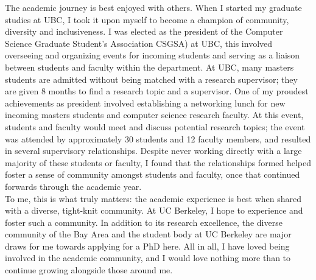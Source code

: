 \documentclass[10pt]{article} %
\begin{document}
The academic journey is best enjoyed with others. When I started my graduate studies at UBC, I took it upon myself to become a champion of community, diversity and inclusiveness. I was elected as the president of the Computer Science Graduate Student's Association CSGSA) at UBC, this involved overseeing and organizing events for incoming students and serving as a liaison between students and faculty within the department. At UBC, many masters students are admitted without being matched with a research supervisor; they are given 8 months to find a research topic and a supervisor. One of my proudest achievements as president involved establishing a networking lunch for new incoming masters students and computer science research faculty. At this event, students and faculty would meet and discuss potential research topics; the event was attended by approximately 30 students and 12 faculty members, and resulted in several supervisory relationships. Despite never working directly with a large majority of these students or faculty, I found that the relationships formed helped foster a sense of community amongst students and faculty, once that continued forwards through the academic year. \\

To me, this is what truly matters: the academic experience is best when shared with a diverse, tight-knit community. At UC Berkeley, I hope to experience and foster such a community. In addition to its research excellence, the diverse community of the Bay Area and the student body at UC Berkeley are major draws for me towards applying for a PhD here. All in all, I have loved being involved in the academic community, and I would love nothing more than to continue growing alongside those around me. \\
\end{document}
